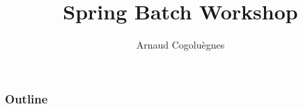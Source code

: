 \documentclass{beamer}
\title{Spring Batch Workshop}
\author{Arnaud Cogoluègnes}
\institute{Consultant with Zenika, Co-author Spring Batch in Action}
\begin{document}
\begin{frame}
\titlepage
\end{frame}

\begin{frame}
 \frametitle{Outline}
 \scriptsize{\tableofcontents}
\end{frame}





















\end{document}
